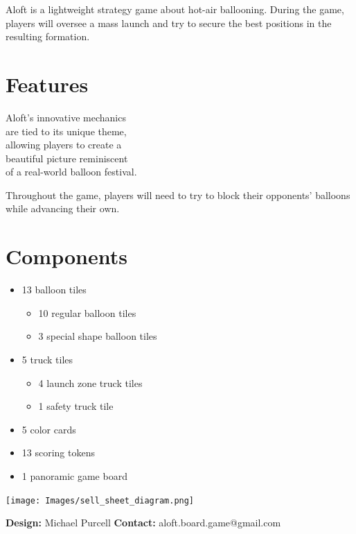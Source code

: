 \documentclass[a5paper, DIV=18, 12pt]{scrartcl}
\begin{document}
\vspace{-0.5ex}
\flushleft
Aloft is a lightweight strategy game about hot-air ballooning. During the game, players will oversee a mass launch and try to secure the best positions in the resulting formation.
\flushleft
\vspace{-0ex}
\begin{multicols}{2}
\section*{\textcolor{SunriseBlue}{Features}}
Aloft's innovative mechanics\\are tied to its unique theme,\\ allowing players to create a\\beautiful picture reminiscent\\of a real-world balloon festival.
\vspace{2.03ex}
 
Throughout the game, players will need to try to block their opponents' balloons while advancing their own.  \vfill\null\columnbreak

\section*{\textcolor{SunriseBlue}{Components}}
\begin{itemize}[nosep, leftmargin=*]
	\item 13 balloon tiles
	\begin{itemize}[nosep, leftmargin=*]
	  \item 10 regular balloon tiles
	  \item 3 special shape balloon tiles
	\end{itemize}
	\vspace{0.5ex}
	\item 5 truck tiles
	\begin{itemize}[nosep, leftmargin=*]
	  \item 4 launch zone truck tiles
	  \item 1 safety truck tile
	\end{itemize}
	\vspace{0.5ex}
	\item 5 color cards
	\vspace{0.5ex}
	\item 13 scoring tokens
	\vspace{0.5ex}
	\item 1 panoramic game board
\end{itemize}
\vspace{3.2ex}
\end{multicols}
\begin{center}
\vspace{-1.5ex}
\texttt{[image: Images/sell\_sheet\_diagram.png]}
\end{center}
\textbf{Design:} Michael Purcell \hfill \textbf{Contact:} aloft.board.game@gmail.com
\end{document}
